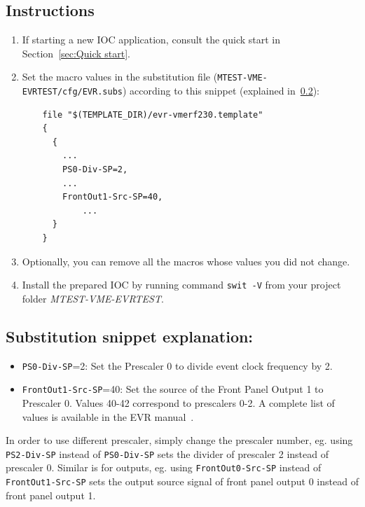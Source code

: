 \documentclass[12pt,a4paper]{article}
\begin{document}
\subsection{Instructions}
\begin{enumerate}
	\item If starting a new IOC application, consult the quick start in Section~\ref{sec:Quick start}.

	\item Set the macro values in the substitution file (\texttt{MTEST-VME-EVRTEST/cfg/EVR.subs}) according to this snippet (explained in~\ref{sec:explain_clock}):
\begin{verbatim}
	file "$(TEMPLATE_DIR)/evr-vmerf230.template"
	{
	  {
	    ...
	    PS0-Div-SP=2,
	    ...
	    FrontOut1-Src-SP=40,
		    ...
	  }
	}
\end{verbatim}

	\item Optionally, you can remove all the macros whose values you did not change. 
	\item Install the prepared IOC by running command \texttt{swit -V} from your project folder \textit{MTEST-VME-EVRTEST}.
\end{enumerate}

\subsection{Substitution snippet explanation:}\label{sec:explain_clock}
\begin{itemize}
	\item \texttt{PS0-Div-SP}=2: Set the Prescaler 0 to divide event clock frequency by 2.
	\item \texttt{FrontOut1-Src-SP}=40: Set the source of the Front Panel Output 1 to Prescaler 0. Values 40-42 correspond to prescalers 0-2. A complete list of values is available in the EVR manual~\cite{evr_manual}.
\end{itemize}

In order to use different prescaler, simply change the prescaler number, eg. using \texttt{PS2-Div-SP} instead of \texttt{PS0-Div-SP} sets the divider of prescaler 2 instead of prescaler 0.
Similar is for outputs, eg. using \texttt{FrontOut0-Src-SP} instead of \texttt{FrontOut1-Src-SP} sets the output source signal of front panel output 0 instead of front panel output 1.
\end{document}
